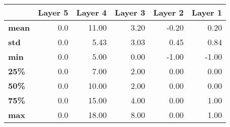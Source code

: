\begin{tabular}{lrrrrr}
\toprule
{} &  Layer 5 &  Layer 4 &  Layer 3 &  Layer 2 &  Layer 1 \\
\midrule
\textbf{mean} &      0.0 &    11.00 &     3.20 &    -0.20 &     0.20 \\
\textbf{std } &      0.0 &     5.43 &     3.03 &     0.45 &     0.84 \\
\textbf{min } &      0.0 &     5.00 &     0.00 &    -1.00 &    -1.00 \\
\textbf{25\% } &      0.0 &     7.00 &     2.00 &     0.00 &     0.00 \\
\textbf{50\% } &      0.0 &    10.00 &     2.00 &     0.00 &     0.00 \\
\textbf{75\% } &      0.0 &    15.00 &     4.00 &     0.00 &     1.00 \\
\textbf{max } &      0.0 &    18.00 &     8.00 &     0.00 &     1.00 \\
\bottomrule
\end{tabular}
